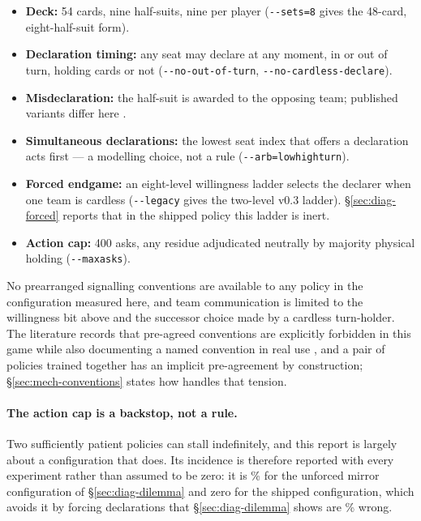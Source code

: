 \begin{itemize}
  \item \textbf{Deck:} 54 cards, nine half-suits, nine per player
        (\texttt{-{}-sets=8} gives the 48-card, eight-half-suit form).
  \item \textbf{Declaration timing:} any seat may declare at any moment, in or
        out of turn, holding cards or not (\texttt{-{}-no-out-of-turn},
        \texttt{-{}-no-cardless-declare}).
  \item \textbf{Misdeclaration:} the half-suit is awarded to the opposing team;
        published variants differ here \cite{pagat}.
  \item \textbf{Simultaneous declarations:} the lowest seat index that offers a
        declaration acts first --- a modelling choice, not a rule
        (\texttt{-{}-arb=low\textbar high\textbar turn}).
  \item \textbf{Forced endgame:} an eight-level willingness ladder selects the
        declarer when one team is cardless (\texttt{-{}-legacy} gives the
        two-level v0.3 ladder). \S\ref{sec:diag-forced} reports that in the
        shipped policy this ladder is inert.
  \item \textbf{Action cap:} 400 asks, any residue adjudicated neutrally by
        majority physical holding (\texttt{-{}-maxasks}).
\end{itemize}

No prearranged signalling conventions are available to any policy in the
configuration measured here, and team communication is limited to the willingness
bit above and the successor choice made by a cardless turn-holder. The literature
records that pre-agreed conventions are explicitly forbidden in this game
\cite{develin} while also documenting a named convention in real use
\cite{pagat}, and a pair of policies trained together has an implicit
pre-agreement by construction; \S\ref{sec:mech-conventions} states how \vfive{}
handles that tension.

\paragraph{The action cap is a backstop, not a rule.} Two sufficiently patient
policies can stall indefinitely, and this report is largely about a configuration
that does. Its incidence is therefore reported with every experiment rather than
assumed to be zero: it is \numPatientCap\% for the unforced mirror configuration
of \S\ref{sec:diag-dilemma} and zero for the shipped \vfour{} configuration,
which avoids it by forcing declarations that \S\ref{sec:diag-dilemma} shows are
\numPostHorizonWrong\% wrong.
